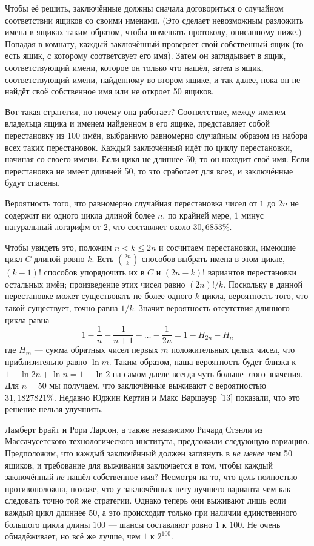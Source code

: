 Чтобы её решить, заключённые должны сначала договориться о случайном соответствии ящиков со своими именами.
(Это сделает невозможным разложить имена в ящиках таким образом, чтобы помешать протоколу, описанному ниже.)
Попадая в комнату, каждый заключённый проверяет свой собственный ящик (то есть ящик, с которому соответсвует его имя).
Затем он заглядывает в ящик, соответствующий имени, которое он только что нашёл,
затем в ящик, соответствующий имени, найденному во втором ящике, и так далее, пока он не найдёт своё собственное имя или не откроет 50 ящиков.

Вот такая стратегия, но почему она работает?
Соответствие, между именем владельца ящика и именем найденном в его ящике, представляет собой перестановку из 100 имён, выбранную равномерно случайным образом из набора всех таких перестановок.
Каждый заключённый идёт по циклу перестановки, начиная со своего имени.
Если цикл не длиннее 50, то он находит своё имя.
Если перестановка не имеет длинней 50, то это сработает для всех, и заключённые будут спасены.

Вероятность того, что равномерно случайная перестановка чисел от $1$ до $2n$ не содержит ни одного цикла длиной более $n$, по крайней мере, $1$ минус натуральный логарифм от $2$, что составляет около $30,6853\%$.

Чтобы увидеть это, положим $n < k \le 2n$ и сосчитаем перестановки, имеющие цикл $C$ длиной ровно $k$.
Есть $\binom{2n}k$ способов выбрать имена в этом цикле, $(k - 1)!$ способов упорядочить их в $C$
и $(2n - k)!$ вариантов перестановки остальных имён;
произведение этих чисел равно $(2n)!/k$.
Поскольку в данной перестановке может существовать не более одного $k$-цикла, вероятность того, что такой существует, точно равна $1/k$.
Значит вероятность отсутствия длинного цикла равна
\[1-\frac{1}{n}-\frac{1}{n+1}-\dots-\frac{1}{2n}=1-H_{2n}-H_n\]
где $H_m$ --- сумма обратных чисел первых $m$ положительных целых чисел, что приблизительно равно $\ln m$.
Таким образом, наша вероятность будет близка к $1 - \ln 2n + \ln n = 1 - \ln 2$ на самом длеле всегда чуть больше этого значения.
Для $n = 50$ мы получаем, что заключённые выживают с вероятностью $31,1827821\%$.
Недавно Юджин  Кертин и Макс Варшауэр [13] показали, что это решение нельзя улучшить.

Ламберт Брайт и Рори Ларсон, а также независимо Ричард Стэнли из Массачусетского технологического института, предложили следующую вариацию.
Предположим, что каждый заключённый должен заглянуть в \emph{не менее} чем 50 ящиков, и требование для выживания заключается в том, чтобы каждый заключённый \emph{не} нашёл собственное имя?
Несмотря на то, что цель полностью противоположна, похоже, что у заключённых нету лучшего варианта чем как следовать точно той же стратегии.
Однако теперь они выживают лишь если каждый цикл длиннее $50$, а это происходит только при наличии единственного большого цикла длины $100$ --- шансы составляют ровно $1$ к $100$.
Не очень обнадёживает, но всё же лучше, чем $1$ к $2^{100}$.

